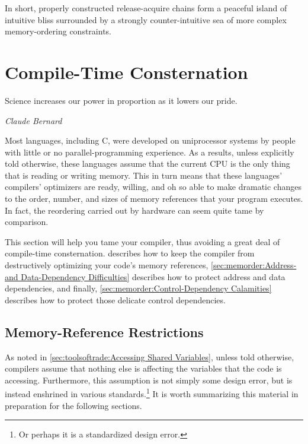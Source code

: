 In short, properly constructed release-acquire chains form a peaceful
island of intuitive bliss surrounded by a strongly counter-intuitive
sea of more complex memory-ordering constraints.


\section{Compile-Time Consternation}
\label{sec:memorder:Compile-Time Consternation}
%
\epigraph{Science increases our power in proportion as it lowers our pride.}
	 {\emph{Claude Bernard}}

Most languages, including C, were developed on uniprocessor systems
by people with little or no parallel-programming experience.
As a results, unless explicitly told otherwise, these languages assume
that the current CPU is the only thing that is reading or writing memory.
This in turn means that these languages' compilers' optimizers
are ready, willing, and oh so able to make dramatic changes to the
order, number, and sizes of memory references that your program
executes.
In fact, the reordering carried out by hardware can seem quite tame
by comparison.

This section will help you tame your compiler, thus avoiding a great
deal of compile-time consternation.
describes how to keep the compiler from destructively optimizing
your code's memory references,
\cref{sec:memorder:Address- and Data-Dependency Difficulties}
describes how to protect address and data dependencies,
and finally,
\cref{sec:memorder:Control-Dependency Calamities}
describes how to protect those delicate control dependencies.

\subsection{Memory-Reference Restrictions}
\label{sec:memorder:Memory-Reference Restrictions}

As noted in \cref{sec:toolsoftrade:Accessing Shared Variables},
unless told otherwise, compilers assume that nothing else
is affecting the variables that the code is accessing.
Furthermore, this assumption is not simply some design error, but is
instead enshrined in various standards.\footnote{
	Or perhaps it is a standardized design error.}
It is worth summarizing this material in preparation for the following
sections.

